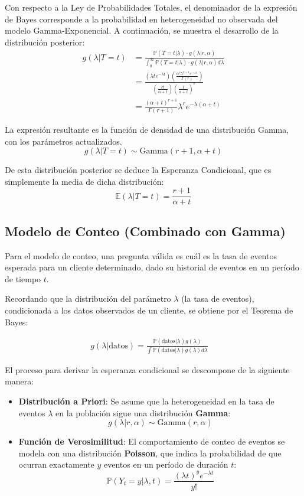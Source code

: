 \documentclass[
]{book}
\begin{document}
Con respecto a la Ley de Probabilidades Totales, el denominador de la
expresión de Bayes corresponde a la probabilidad en heterogeneidad no
observada del modelo Gamma-Exponencial. A continuación, se muestra el
desarrollo de la distribución posterior: \[
\begin{aligned}
g(\lambda|T=t) &= \frac{\mathbb{P}(T=t|\lambda) \cdot g(\lambda|r, \alpha)}{\int_0^\infty \mathbb{P}(T=t|\lambda) \cdot g(\lambda|r, \alpha) d\lambda} \\
&= \frac{ \left( \lambda t e^{-\lambda t} \right) \left( \frac{\alpha^r \lambda^{r-1} e^{-\alpha\lambda}}{\Gamma(r)} \right) }{\left(\frac{rt}{\alpha + t} \right) \left(\frac{1}{\alpha + t} \right)^r} \\
&= \frac{(\alpha+t)^{r+1}}{\Gamma(r+1)}\lambda^{r}e^{-\lambda(\alpha+t)}
\end{aligned}
\]

La expresión resultante es la función de densidad de una distribución
Gamma, con los parámetros actualizados.
\[g(\lambda|T=t) \sim \text{Gamma}(r+1, \alpha+t)\]

De esta distribución posterior se deduce la Esperanza Condicional, que
es simplemente la media de dicha distribución:
\[ \mathbb{E}(\lambda|T=t) = \frac{r+1}{\alpha+t} \]

\subsection{Modelo de Conteo (Combinado con Gamma)}\label{modelo-de-conteo-combinado-con-gamma}

Para el modelo de conteo, una pregunta válida es cuál es la tasa de
eventos esperada para un cliente determinado, dado su historial de
eventos en un período de tiempo \(t\).

Recordando que la distribución del parámetro \(\lambda\) (la tasa de
eventos), condicionada a los datos observados de un cliente, se obtiene
por el Teorema de Bayes:

\[
\begin{aligned}
g(\lambda|\text{datos}) = \frac{\mathbb{P}(\text{datos}|\lambda)g(\lambda)}{\int \mathbb{P}(\text{datos}|\lambda)g(\lambda)d\lambda}
\end{aligned}
\quad \label{eq:thetabayes} \]

El proceso para derivar la esperanza condicional se descompone de la
siguiente manera:

\begin{itemize}
\item
  \textbf{Distribución a Priori}: Se asume que la heterogeneidad en la tasa
  de eventos \(\lambda\) en la población sigue una distribución
  \textbf{Gamma}: \[ g(\lambda|r, \alpha) \sim \text{Gamma}(r, \alpha) \]
\item
  \textbf{Función de Verosimilitud}: El comportamiento de conteo de eventos
  se modela con una distribución \textbf{Poisson}, que indica la
  probabilidad de que ocurran exactamente \(y\) eventos en un período de
  duración \(t\):
  \[ \mathbb{P}(Y_t=y|\lambda,t) = \frac{(\lambda t)^y e^{-\lambda t}}{y!} \]
\end{itemize}
\end{document}
